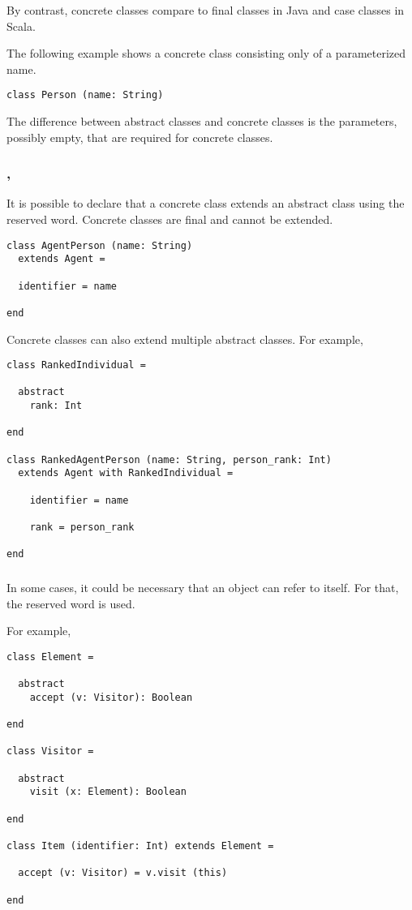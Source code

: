 By contrast, concrete classes compare to final classes in Java and case classes in Scala.

The following example shows a concrete class consisting only of a parameterized name.
\begin{lstlisting}[label={lst:exampleConcreteClass}]
class Person (name: String)
\end{lstlisting}

The difference between abstract classes and concrete classes is the parameters, possibly empty, that are required for concrete classes.

\subsubsection{\sodaextends, \sodawith}

It is possible to declare that a concrete class extends an abstract class using the \sodaextends reserved word.
Concrete classes are final and cannot be extended.

\begin{lstlisting}[label={lst:exampleExtends}]
class AgentPerson (name: String)
  extends Agent =

  identifier = name

end
\end{lstlisting}

Concrete classes can also extend multiple abstract classes.
For example,
\begin{lstlisting}[label={lst:exampleWith}]
class RankedIndividual =

  abstract
    rank: Int

end

class RankedAgentPerson (name: String, person_rank: Int)
  extends Agent with RankedIndividual =

    identifier = name

    rank = person_rank

end
\end{lstlisting}

\subsubsection{\sodathis}

In some cases, it could be necessary that an object can refer to itself.
For that, the \sodathis reserved word is used.

For example,
\begin{lstlisting}[label={lst:exampleExtendsElement}]
class Element =

  abstract
    accept (v: Visitor): Boolean

end

class Visitor =

  abstract
    visit (x: Element): Boolean

end

class Item (identifier: Int) extends Element =

  accept (v: Visitor) = v.visit (this)

end
\end{lstlisting}


